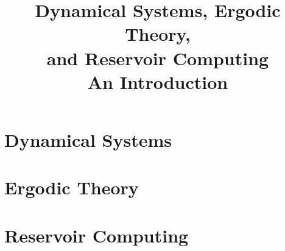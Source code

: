 \documentclass[11pt,a4paper]{book}
\title{\Huge\bfseries Dynamical Systems, Ergodic Theory,\\and Reservoir Computing\\[0.5em]\Large An Introduction}
\author{}
\date{}
\theoremstyle{definition}
\theoremstyle{plain}
\theoremstyle{remark}
\begin{document}
\frontmatter
\maketitle

\tableofcontents

\mainmatter

\part{Dynamical Systems}







\part{Ergodic Theory}







\part{Reservoir Computing}






\backmatter
\end{document}
